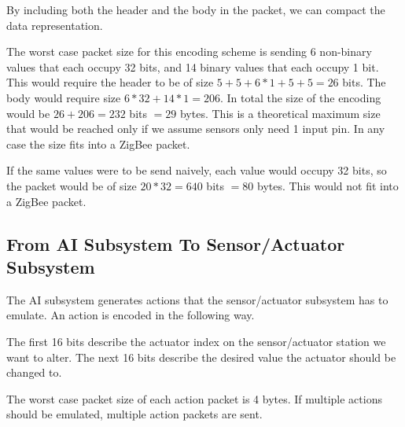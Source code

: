 By including both the header and the body in the packet, we can compact the data representation.

The worst case packet size for this encoding scheme is sending 6 non-binary values that each occupy 32 bits, and 14 binary values that each occupy 1 bit. This would require the header to be of size $5 + 5 + 6 * 1 + 5 + 5 = 26$ bits. The body would require size $6 * 32 + 14 * 1 = 206$. In total the size of the encoding would be $26 + 206 = 232$ bits $= 29$ bytes. This is a theoretical maximum size that would be reached only if we assume sensors only need 1 input pin. In any case the size fits into a ZigBee packet.

If the same values were to be send naively, each value would occupy 32 bits, so the packet would be of size $20 * 32 = 640$ bits $=80$ bytes. This would not fit into a ZigBee packet.

\subsection{From  AI Subsystem To Sensor/Actuator Subsystem}

The AI subsystem generates actions that the sensor/actuator subsystem has to emulate. An action is encoded in the following way.

The first 16 bits describe the actuator index on the sensor/actuator station we want to alter. The next 16 bits describe the desired value the actuator should be changed to.

The worst case packet size of each action packet is 4 bytes. If multiple actions should be emulated, multiple action packets are sent.
